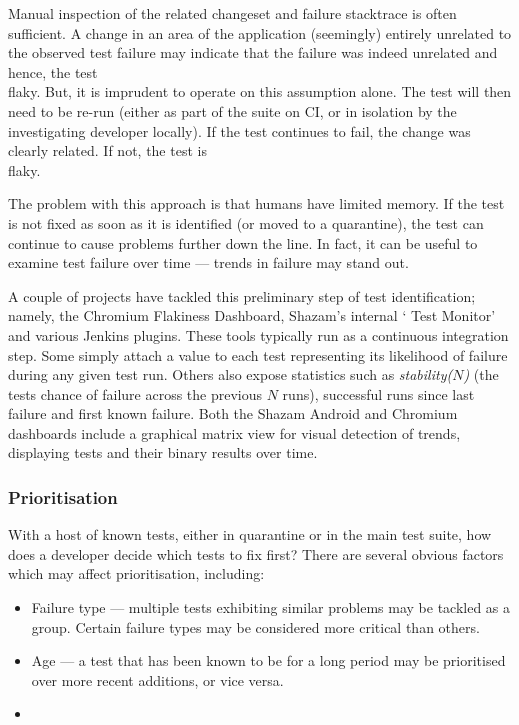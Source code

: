 Manual inspection of the related changeset and failure stacktrace is often sufficient. A change in an area of the application (seemingly) entirely unrelated to the observed test failure may indicate that the failure was indeed unrelated and hence, the test \\flaky{}. But, it is imprudent to operate on this assumption alone. The test will then need to be re-run (either as part of the suite on CI, or in isolation by the investigating developer locally). If the test continues to fail, the change was clearly related. If not, the test is \\flaky{}.

The problem with this approach is that humans have limited memory. If the \flaky{} test is not fixed as soon as it is identified (or moved to a quarantine), the test can continue to cause problems further down the line. In fact, it can be useful to examine test failure over time --- trends in failure may stand out.

A couple of projects have tackled this preliminary step of \flaky{} test identification; namely, the Chromium Flakiness Dashboard\cite{flakinessDashboard}, Shazam’s internal {\lq}\flaky{} Test Monitor{\rq} and various Jenkins plugins. These tools typically run as a continuous integration step. Some simply attach a value to each test representing its likelihood of failure during any given test run. Others also expose statistics such as \emph{stability($N$)} (the tests chance of failure across the previous $N$ runs), successful runs since last failure and first known failure. Both the Shazam Android and Chromium dashboards include a graphical matrix view for visual detection of trends, displaying tests and their binary results over time.

\subsubsection{Prioritisation}

With a host of known \flaky{} tests, either in quarantine or in the main test suite, how does a developer decide which tests to fix first? There are several obvious factors which may affect prioritisation, including:
\begin{itemize}
	\item Failure type --- multiple \flaky{} tests exhibiting similar problems may be tackled as a group. Certain failure types may be considered more critical than others.
	\item Age --- a \flaky{} test that has been known to be \flaky{} for a long period may be prioritised over more recent additions, or vice versa.
	\item {}
\end{itemize}

